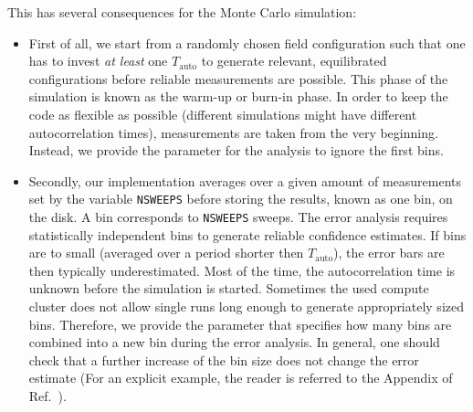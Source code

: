 This has several consequences for the Monte Carlo simulation:
\begin{itemize}
	\item First of all, we start from a randomly chosen field configuration such that one has to invest \textit{at least} one $T_\mathrm{auto}$ to generate relevant, equilibrated configurations before reliable measurements are possible. This phase of the simulation is known as the warm-up or burn-in phase. In order to keep the code as flexible as possible (different simulations might have different autocorrelation times), measurements are taken from the very beginning. Instead, we provide the parameter  for the analysis to ignore the first  bins.
	\item Secondly, our implementation averages over a given amount of measurements   set by the variable \texttt{NSWEEPS}  before storing the results, known as one bin, on the disk.  A bin corresponds to \texttt{NSWEEPS}  sweeps. The  error analysis requires statistically  independent bins to generate reliable confidence estimates. If bins are to small (averaged over a period shorter then $T_\mathrm{auto}$), the error bars are then typically underestimated. Most of the time, the autocorrelation time is unknown before the simulation is started.  Sometimes the used compute cluster does not allow single runs long enough to generate appropriately sized bins. Therefore, we provide the  parameter that specifies how many bins are combined into a new bin during the error analysis. In general, one should check that a further increase of the bin size does not change the error estimate   (For an explicit example, the reader is referred to the Appendix of Ref.~\cite{Assaad02}).


\end{itemize}
